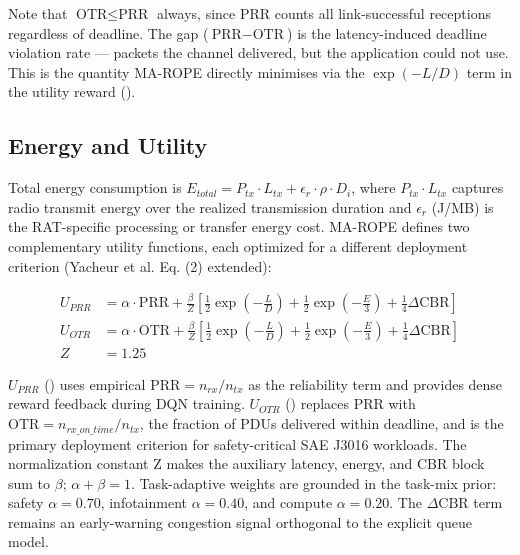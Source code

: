 Note that $\text{OTR} \leq \text{PRR}$ always, since PRR counts all link-successful receptions regardless of deadline. The gap ($\text{PRR} - \text{OTR}$) is the latency-induced deadline violation rate --- packets the channel delivered, but the application could not use. This is the quantity MA-ROPE directly minimises via the $\exp(-L/D)$ term in the utility reward ().

\subsection{Energy and Utility}

Total energy consumption is $E_{total} = P_{tx} \cdot L_{tx} + \epsilon_r \cdot \rho \cdot D_i$, where $P_{tx} \cdot L_{tx}$ captures radio transmit energy over the realized transmission duration and $\epsilon_r$ (J/MB) is the RAT-specific processing or transfer energy cost. MA-ROPE defines two complementary utility functions, each optimized for a different deployment criterion (Yacheur et al. \cite{9} Eq. (2) extended):

\begin{subequations}
\label{eq:utility_all}
\begin{align}
U_{PRR} &= \alpha \cdot \text{PRR} + \frac{\beta}{Z} \left[ \frac{1}{2}\exp\left(-\frac{L}{D}\right) + \frac{1}{2}\exp\left(-\frac{E}{3}\right) + \frac{1}{4}\Delta\text{CBR} \right] \label{eq:uprr} \\
U_{OTR} &= \alpha \cdot \text{OTR} + \frac{\beta}{Z} \left[ \frac{1}{2}\exp\left(-\frac{L}{D}\right) + \frac{1}{2}\exp\left(-\frac{E}{3}\right) + \frac{1}{4}\Delta\text{CBR} \right] \label{eq:uotr} \\
Z &= 1.25 \label{eq:z}
\end{align}
\end{subequations}

$U_{PRR}$ () uses empirical $\text{PRR} = n_{rx}/n_{tx}$ as the reliability term and provides dense reward feedback during DQN training. $U_{OTR}$ () replaces PRR with $\text{OTR} = n_{rx\_on\_time}/n_{tx}$, the fraction of PDUs delivered within deadline, and is the primary deployment criterion for safety-critical SAE J3016 workloads. The normalization constant Z makes the auxiliary latency, energy, and CBR block sum to $\beta$; $\alpha + \beta = 1$. Task-adaptive weights are grounded in the task-mix prior: safety $\alpha=0.70$, infotainment $\alpha=0.40$, and compute $\alpha=0.20$. The $\Delta\text{CBR}$ term remains an early-warning congestion signal orthogonal to the explicit queue model.

